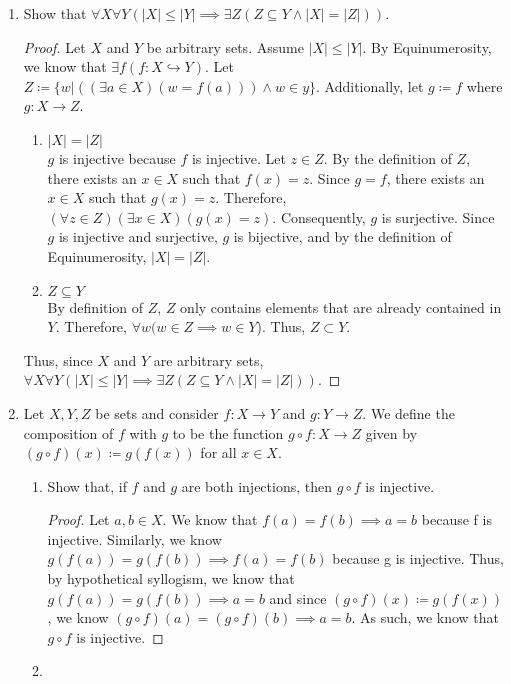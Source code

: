 \documentclass{article}
\newcommand{\defeq}{\coloneqq}
\newcommand{\injects}{\hookrightarrow}
\begin{document}
\begin{enumerate}
    \item Show that $\forall X \forall Y (|X| \leq  |Y| \implies \exists Z(Z \subseteq Y \land |X| = |Z|))$.
    \begin{proof}
        Let $X$ and $Y$ be arbitrary sets. Assume $|X| \leq  |Y|$. By Equinumerosity, we know that $\exists f(f:X \injects Y)$. Let $Z \defeq \{w|((\exists a \in X)(w=f(a)))\land w \in y\}$. Additionally, let $g \defeq f$ where $g:X \to Z$.
        \begin{enumerate}
            \item[] $|X| = |Z|$\\
            $g$ is injective because $f$ is injective. Let $z \in Z$. By the definition of $Z$, there exists an $x \in X$ such that $f(x)=z$. Since $g=f$, there exists an $x \in X$ such that $g(x)=z$. Therefore, $(\forall z \in Z)(\exists x \in X)(g(x)=z)$. Consequently, $g$ is surjective. Since $g$ is injective and surjective, $g$ is bijective, and by the definition of Equinumerosity, $|X|=|Z|$.
            \item[] $Z \subseteq Y$\\
                By definition of $Z$, $Z$ only contains elements that are already contained in $Y$. Therefore, $\forall w (w \in Z \implies w \in Y$). Thus, $Z \subset Y$.
        \end{enumerate}
        Thus, since $X$ and $Y$ are arbitrary sets, $\forall X \forall Y (|X| \leq  |Y| \implies \exists Z(Z \subseteq Y \land |X| = |Z|))$.
    \end{proof}
\pagebreak
    \item
    Let $X, Y, Z$ be sets and consider $f: X \to Y$ and $g: Y \to Z$. We define the composition of $f$ with $g$ to be the function $g \circ f: X \to Z$ given by $(g \circ f)(x) \defeq g(f(x))$ for all $x \in X$.
    \begin{enumerate}
      \item
        Show that, if $f$ and $g$ are both injections,
        then $g \circ f$ is injective.
        \begin{proof}
            Let $a,b \in X$. We know that $f(a)=f(b) \implies a=b$ because f is injective. Similarly, we know $g(f(a))=g(f(b)) \implies f(a)=f(b)$ because g is injective. Thus, by hypothetical syllogism, we know that $g(f(a))=g(f(b)) \implies a=b$ and since $(g \circ f)(x) \defeq g(f(x))$, we know $(g \circ f)(a)=(g \circ f)(b) \implies a=b$. As such, we know that $g \circ f$ is injective.
        \end{proof}
      \item

\end{enumerate}
\end{enumerate}
\end{document}
